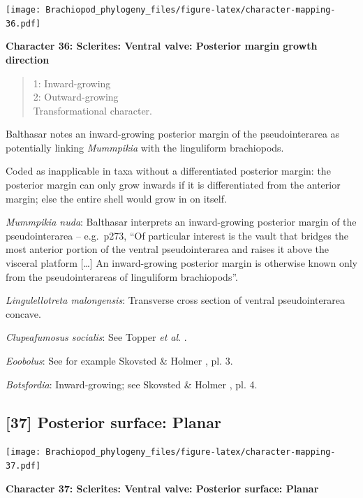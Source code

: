 \documentclass[]{book}
\theoremstyle{definition}
\theoremstyle{definition}
\theoremstyle{definition}
\theoremstyle{remark}
\begin{document}
\texttt{[image: Brachiopod\_phylogeny\_files/figure-latex/character-mapping-36.pdf]}

\textbf{Character 36: Sclerites: Ventral valve: Posterior margin growth
direction}

\begin{quote}
1: Inward-growing\\
2: Outward-growing\\
Transformational character.
\end{quote}

Balthasar \citeyearpar{Balthasar2008iMummpikia} notes an inward-growing
posterior margin of the pseudointerarea as potentially linking
\emph{Mummpikia} with the linguliform brachiopods.

Coded as inapplicable in taxa without a differentiated posterior margin:
the posterior margin can only grow inwards if it is differentiated from
the anterior margin; else the entire shell would grow in on itself.

\emph{Mummpikia nuda}: Balthasar \citeyearpar{Balthasar2008iMummpikia}
interprets an inward-growing posterior margin of the pseudointerarea --
e.g.~p273, ``Of particular interest is the vault that bridges the most
anterior portion of the ventral pseudointerarea and raises it above the
visceral platform {[}\ldots{}{]} An inward-growing posterior margin is
otherwise known only from the pseudointerareas of linguliform
brachiopods''.

\emph{Lingulellotreta malongensis}: Transverse cross section of ventral
pseudointerarea concave.

\emph{Clupeafumosus socialis}: See Topper \emph{et al}.
\citeyearpar{Topper2013Reappraisalof}.

\emph{Eoobolus}: See for example Skovsted \& Holmer
\citeyearpar{Skovsted2005EarlyCambrian}, pl. 3.

\emph{Botsfordia}: Inward-growing; see Skovsted \& Holmer
\citeyearpar{Skovsted2005EarlyCambrian}, pl. 4.

\hypertarget{posterior-surface-planar}{%
\subsection*{{[}37{]} Posterior surface:
Planar}\label{posterior-surface-planar}}

\texttt{[image: Brachiopod\_phylogeny\_files/figure-latex/character-mapping-37.pdf]}

\textbf{Character 37: Sclerites: Ventral valve: Posterior surface:
Planar}
\end{document}
